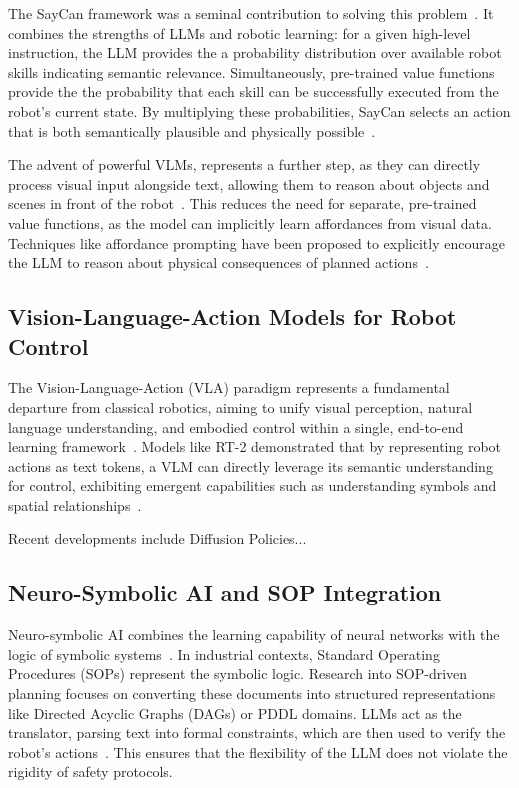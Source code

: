 \documentclass[sensors,article,submit,pdftex,moreauthors]{Definitions/mdpi}
\begin{document}
The SayCan framework was a seminal contribution to solving this problem~\cite{Ahn2022}. It combines the strengths of LLMs and robotic learning: for a given high-level instruction, the LLM provides the a probability distribution over available robot skills indicating semantic relevance. Simultaneously, pre-trained value functions provide the the probability that each skill can be successfully executed from the robot's current state. By multiplying these probabilities, SayCan selects an action that is both semantically plausible and physically possible~\cite{Ahn2022}.

The advent of powerful VLMs, represents a further step, as they can directly process visual input alongside text, allowing them to reason about objects and scenes in front of the robot~\cite{Chi2023}. This reduces the need for separate, pre-trained value functions, as the model can implicitly learn affordances from visual data. Techniques like affordance prompting have been proposed to explicitly encourage the LLM to reason about physical consequences of planned actions~\cite{Yu2024}.

\subsection{Vision-Language-Action Models for Robot Control}

The Vision-Language-Action (VLA) paradigm represents a fundamental departure from classical robotics, aiming to unify visual perception, natural language understanding, and embodied control within a single, end-to-end learning framework~\cite{Wei2022}. Models like RT-2 demonstrated that by representing robot actions as text tokens, a VLM can directly leverage its semantic understanding for control, exhibiting emergent capabilities such as understanding symbols and spatial relationships~\cite{Ahn2022}.

Recent developments include Diffusion Policies...

\subsection{Neuro-Symbolic AI and SOP Integration}

Neuro-symbolic AI combines the learning capability of neural networks with the logic of symbolic systems~\cite{Singh2023}. In industrial contexts, Standard Operating Procedures (SOPs) represent the symbolic logic. Research into SOP-driven planning focuses on converting these documents into structured representations like Directed Acyclic Graphs (DAGs) or PDDL domains. LLMs act as the translator, parsing text into formal constraints, which are then used to verify the robot's actions~\cite{Singh2023}. This ensures that the flexibility of the LLM does not violate the rigidity of safety protocols.
\end{document}
